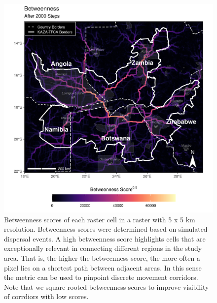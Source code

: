 \documentclass[abstract=on,10pt,a4paper,bibliography=totocnumbered]{article}
\begin{document}
\begin{figure}
  \includegraphics[width=\textwidth]{99_Betweenness.png}
  \caption{Betweenness scores of each raster cell in a raster with 5 x 5 km
  resolution. Betweenness scores were determined based on simulated dispersal
  events. A high betweenness score highlights cells that are exceptionally
  relevant in connecting different regions in the study area. That is, the
  higher the betweenness score, the more often a pixel lies on a shortest path
  between adjacent areas. In this sense the metric can be used to pinpoint
  discrete movement corridors. Note that we square-rooted betweenness scores to
  improve visibility of corrdiors with low scores.}
  \label{Betweenness}
\end{figure}
\end{document}
